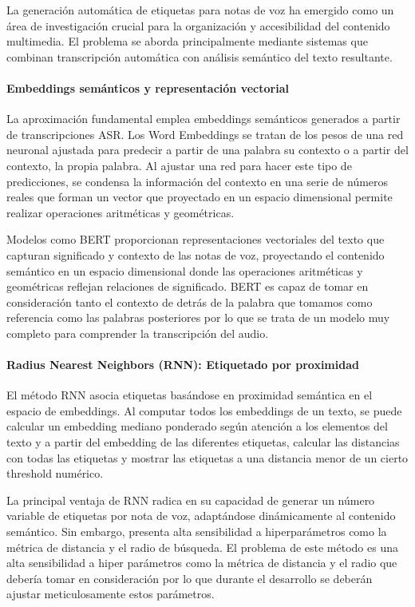 La generación automática de etiquetas para notas de voz ha emergido como un área de investigación crucial para la organización y accesibilidad del contenido multimedia. El problema se aborda principalmente mediante sistemas que combinan transcripción automática con análisis semántico del texto resultante.

\paragraph{Embeddings semánticos y representación vectorial}

La aproximación fundamental emplea embeddings semánticos generados a partir de transcripciones ASR. Los Word Embeddings se tratan de los pesos de una red neuronal ajustada para predecir a partir de una palabra su contexto o a partir del contexto, la propia palabra. Al ajustar una red para hacer este tipo de predicciones, se condensa la información del contexto en una serie de números reales que forman un vector que proyectado en un espacio dimensional permite realizar operaciones aritméticas y geométricas.

Modelos como BERT proporcionan representaciones vectoriales del texto que capturan significado y contexto de las notas de voz, proyectando el contenido semántico en un espacio dimensional donde las operaciones aritméticas y geométricas reflejan relaciones de significado. BERT es capaz de tomar en consideración tanto el contexto de detrás de la palabra que tomamos como referencia como las palabras posteriores por lo que se trata de un modelo muy completo para comprender la transcripción del audio.

\paragraph{Radius Nearest Neighbors (RNN): Etiquetado por proximidad}

El método RNN asocia etiquetas basándose en proximidad semántica en el espacio de embeddings. Al computar todos los embeddings de un texto, se puede calcular un embedding mediano ponderado según atención a los elementos del texto y a partir del embedding de las diferentes etiquetas, calcular las distancias con todas las etiquetas y mostrar las etiquetas a una distancia menor de un cierto threshold numérico.

La principal ventaja de RNN radica en su capacidad de generar un número variable de etiquetas por nota de voz, adaptándose dinámicamente al contenido semántico. Sin embargo, presenta alta sensibilidad a hiperparámetros como la métrica de distancia y el radio de búsqueda. El problema de este método es una alta sensibilidad a hiper parámetros como la métrica de distancia y el radio que debería tomar en consideración por lo que durante el desarrollo se deberán ajustar meticulosamente estos parámetros.

